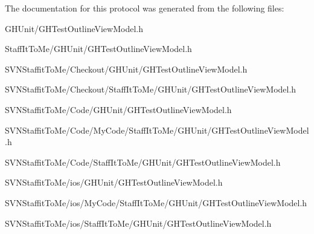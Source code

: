 \-The documentation for this protocol was generated from the following files\-:\begin{DoxyCompactItemize}
\item 
\-G\-H\-Unit/\-G\-H\-Test\-Outline\-View\-Model.\-h\item 
\-Staff\-It\-To\-Me/\-G\-H\-Unit/\-G\-H\-Test\-Outline\-View\-Model.\-h\item 
\-S\-V\-N\-Staffit\-To\-Me/\-Checkout/\-G\-H\-Unit/\-G\-H\-Test\-Outline\-View\-Model.\-h\item 
\-S\-V\-N\-Staffit\-To\-Me/\-Checkout/\-Staff\-It\-To\-Me/\-G\-H\-Unit/\-G\-H\-Test\-Outline\-View\-Model.\-h\item 
\-S\-V\-N\-Staffit\-To\-Me/\-Code/\-G\-H\-Unit/\-G\-H\-Test\-Outline\-View\-Model.\-h\item 
\-S\-V\-N\-Staffit\-To\-Me/\-Code/\-My\-Code/\-Staff\-It\-To\-Me/\-G\-H\-Unit/\-G\-H\-Test\-Outline\-View\-Model.\-h\item 
\-S\-V\-N\-Staffit\-To\-Me/\-Code/\-Staff\-It\-To\-Me/\-G\-H\-Unit/\-G\-H\-Test\-Outline\-View\-Model.\-h\item 
\-S\-V\-N\-Staffit\-To\-Me/ios/\-G\-H\-Unit/\-G\-H\-Test\-Outline\-View\-Model.\-h\item 
\-S\-V\-N\-Staffit\-To\-Me/ios/\-My\-Code/\-Staff\-It\-To\-Me/\-G\-H\-Unit/\-G\-H\-Test\-Outline\-View\-Model.\-h\item 
\-S\-V\-N\-Staffit\-To\-Me/ios/\-Staff\-It\-To\-Me/\-G\-H\-Unit/\-G\-H\-Test\-Outline\-View\-Model.\-h\end{DoxyCompactItemize}
